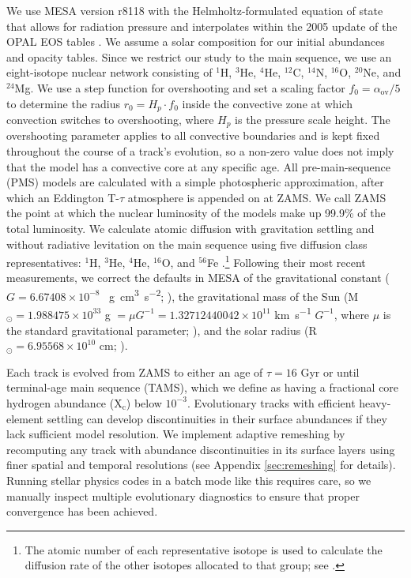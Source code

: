 \documentclass[twocolumn,twocolappendix]{aastex6}
\newif\ifref
\newcommand{\mb}[1]{\ifref\boldmath\textbf{#1}\unboldmath\else #1\fi}
\begin{document}
We use MESA version r8118 with the Helmholtz-formulated equation of state that allows for radiation pressure and interpolates within the 2005 update of the OPAL EOS tables \citep{2002ApJ...576.1064R}. We assume a \citet{1998SSRv...85..161G} solar composition for our initial abundances and opacity tables. Since we restrict our study to the main sequence, we use an eight-isotope nuclear network consisting of $^1$H, $^3$He, $^4$He, $^{12}$C, $^{14}$N, $^{16}$O, $^{20}$Ne, and $^{24}$Mg. We use a step function for overshooting and set a scaling factor $f_0 = \alpha_{\text{ov}}/5$ to determine the radius $r_0 = H_p \cdot f_0$ inside the convective zone at which convection switches to overshooting, where $H_p$ is the pressure scale height. \mb{The overshooting parameter applies to all convective boundaries and is kept fixed throughout the course of a track's evolution, so a non-zero value does not imply that the model has a convective core at any specific age.} %
All pre-main-sequence (PMS) models are calculated with a simple photospheric approximation, after which an Eddington T-$\tau$ atmosphere is appended on at ZAMS. We call ZAMS the point at which the nuclear luminosity of the models make up 99.9\% of the total luminosity. We calculate atomic diffusion with gravitation settling and without radiative levitation on the main sequence using five diffusion class representatives: $^1$H, $^3$He, $^4$He, $^{16}$O, and $^{56}$Fe \citep{burgers1969flow}.\footnote{The atomic number of each representative isotope is used to calculate the diffusion rate of the other isotopes allocated to that group; see \citet{Paxton2011}.} 
Following their most recent measurements, we correct the defaults in MESA of the gravitational constant ($G=6.67408\times 10^{-8}$ \si{\per\g\cm\cubed\per\square\s}; \citealt{2015arXiv150707956M}), the gravitational mass of the Sun (M$_\odot = 1.988475\times 10^{33}$ \si{\g} $= \mu G^{-1} = 1.32712440042\times 10^{11}$ \si{\km\per\s} $G^{-1}$, where $\mu$ is the standard gravitational parameter; \citealt{pitjeva2015determination}), and the solar radius (R$_\odot = 6.95568\times 10^{10}$ \si{\cm}; \citealt{2008ApJ...675L..53H}). 

Each track is evolved from ZAMS to either an age of $\tau=16$ Gyr or until terminal-age main sequence (TAMS), which we define as having a fractional core hydrogen abundance (X$_{\text{c}}$) below $10^{-3}$. Evolutionary tracks with efficient heavy-element settling can develop discontinuities in their surface abundances if they lack sufficient model resolution. We implement adaptive remeshing by recomputing any track with abundance discontinuities in its surface layers using finer spatial and temporal resolutions (see Appendix \mb{\ref{sec:remeshing}} for details). Running stellar physics codes in a batch mode like this requires care, so we manually inspect multiple evolutionary diagnostics to ensure that proper convergence has been achieved. %
\end{document}
